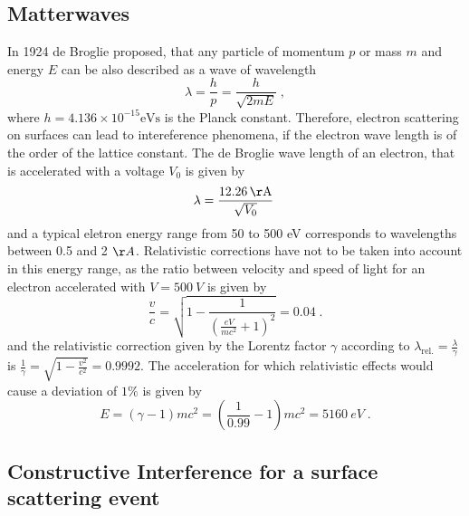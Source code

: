 \documentclass[a4paper]{scrartcl}
\numberwithin{equation}{section}
\numberwithin{figure}{section}
\numberwithin{table}{section}
\newcommand{\eq}[2]{\begin{equation}#1\label{#2}\end{equation}}
\begin{document}
\subsection{Matterwaves}
In 1924 de Broglie proposed, that any particle of momentum $p$ or mass $m$ and energy $E$ can be also described as a wave of wavelength 
\eq{\lambda = \frac{h}{p} =\frac{h}{\sqrt{2mE}} \;,}{lambda}
where $h=4.136\times 10^{-15} \text{eVs}$ is the Planck constant. Therefore, electron scattering on surfaces can lead to intereference phenomena, if the electron wave length is of the order of the lattice constant. The de Broglie wave length of an electron, that is accelerated with a voltage $V_0$ is given by 
\eq{\lambda= \frac{\SI{12.26}{\AA}}{\sqrt{V_0}} \; }{lV}
and a typical eletron energy range from 50 to 500 eV corresponds to wavelengths between 0.5 and 2 $\AA$. Relativistic corrections have not to be taken into account in this energy range, as the ratio between velocity and speed of light for an electron accelerated with $V = \SI{500}{V}$ is given by
\eq{\frac{v}{c}=\sqrt{1-\frac{1}{(\frac{eV}{mc^2}+1)^2}} =0.04 \; .}{} 
and the relativistic correction given by the Lorentz factor $\gamma$ according to $\lambda_\text{rel.} = \frac{\lambda}{\gamma}$ is $\frac{1}{\gamma} = \sqrt{1-\frac{v^2}{c^2}}= 0.9992$. The acceleration for which relativistic effects would cause a deviation of $1\percent$ is given by
\eq{E=(\gamma -1)mc^2= \left(\frac{1}{0.99}-1\right)mc^2=\SI{5160}{eV}\;. }{}

\subsection{Constructive Interference for a surface scattering event}
\end{document}

